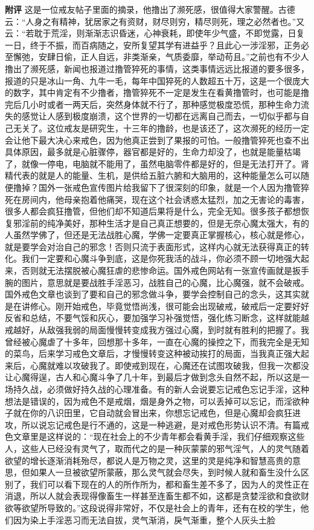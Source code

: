 \begin{case}
    \textbf{附评} 这是一位戒友帖子里面的摘录，他撸出了濒死感，很值得大家警醒。古德云：“人身之有精神，犹居家之有资财，财尽则穷，精尽则死，理之必然者也。”又云：“若耽于荒淫，则渐渐志识昏迷，心神衰耗，即使年少气盛，不即觉露，日复一日，终于不振，而百病随之，安所复望其学有进益乎？且此心一涉淫邪，正务必至懈弛，安肆日偷，正人自远，非类渐亲，气质委靡，举动苟且。”之前也有不少人撸出了濒死感，新闻也报道过撸管猝死的事情，这类事情远远比报道的要多很多，报道的只是冰山一角、九牛一毛，每年中国猝死的人数超五十万，这是一个很庞大的数字，其中肯定有不少撸者，撸管猝死不一定是发生在看黄撸管时，也可能是撸完后几小时或者一两天后，突然身体就不行了，那种感觉极度恐慌，那种生命力流失的感觉让人感到极度崩溃，这个世界的一切都在远离自己而去，一切似乎都与自己无关了。这位戒友是研究生，十三年的撸龄，也是该还了，这次濒死的经历一定会让他下最大决心来戒色，因为他真正尝到了果报的可怕。一般撸管猝死也查不出具体原因，最多就是心脏骤停，器官都是好的，生命力却没了，也就是能量枯竭了，就像一停电，电脑就不能用了，虽然电脑零件都是好的，但是无法打开了。肾精代表的就是人的能量、生机，是供给五脏六腑和大脑用的，这种能量怎么可以随便撸掉？国外一张戒色宣传图片给我留下了很深刻的印象，就是一个人因为撸管猝死在房间内，他母亲抱着他痛哭，现在这个社会诱惑太猛烈，加之无害论的毒害，很多人都会疯狂撸管，但他们却不知道后果将是什么，完全无知。很多孩子都想恢复邪淫前的纯净美好，那种生活才是自己真正想要的，但是无奈心魔太强大，有的人虽然学佛了，但还是无法战胜心魔，学佛一定要真正掌握核心，核心就是修心，就是要学会对治自己的邪念！否则只流于表面形式，这样内心就无法获得真正的转化。我们一定要和心魔斗争到底，这是你死我活的战斗，你必须不顾一切地强大起来，否则就无法摆脱被心魔狂虐的悲惨命运。国外戒色网站有一张宣传画就是扳手腕的图片，意思就是要战胜手淫恶习，战胜自己的心魔，比心魔强，就不会破戒。国外戒色文章也谈到了要和自己的邪念做斗争，要学会控制自己的念头，这其实就是在讲修心。刚开始戒色，毕竟觉悟尚浅，很可能会出现破戒，破戒后一定要好好反省和总结，不要气馁和灰心，要加强学习补强觉悟，强化练习断念，这样就能越戒越好，从敌强我弱的局面慢慢转变成我方强过心魔，到时就有胜利的把握了。我曾经被心魔虐了十多年，回想那十多年，一直在心魔的操控之下，而我完全是无知的菜鸟，后来学习戒色文章后，才慢慢转变这种被动挨打的局面，当我真正强大起来后，心魔就难以攻破我了。即使戒到现在，心魔还在试图攻破我，但我一次都没让心魔得逞，古人和心魔斗争了几十年，到最后才做到念头自然不起，所以这是一场持久战，必须做好持久战的心理准备。有的新人会说要忘记戒色忘记手淫，这种想法是错误的，因为戒色不是戒烟，烟是身外之物，可以丢掉可以忘记，而淫欲种子就在你的八识田里，它自动就会冒出来，你想忘记戒色，但是心魔却会疯狂进攻，所以说忘记戒色是行不通的，这是一种逃避，是对戒色形势认识不清。有篇戒色文章里是这样说的：“现在社会上的不少青年都会看黄手淫，我们仔细观察这些人，这些人已经没有灵气了，取而代之的是一种灰蒙蒙的邪气淫气，人的灵气随着欲望的增长逐渐消耗殆尽，都说人是万物之灵，这里的灵是纯净和智慧高贵的意思，但如果人一旦被欲望所蒙蔽，那么灵气就会尽失，到时候人就和畜生没什么区别了，我们可以看下现在的人的所作所为，都和畜生差不多了，因为人的灵性正在消退，所以人就会表现得像畜生一样甚至连畜生都不如，这都是贪婪淫欲和食欲财欲等欲望所导致的。”这段说得非常好，不仅是社会上的青年，还有在校的学生，他们因为染上手淫恶习而无法自拔，灵气渐消，戾气渐重，整个人灰头土脸
\end{case}
